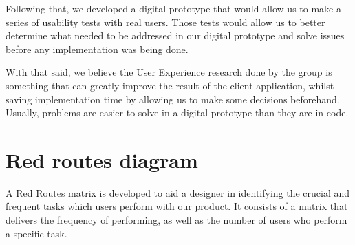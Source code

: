 \documentclass[a4paper,twoside,10pt]{report}
\begin{document}
Following that, we developed a digital prototype that would allow us to make a series of usability tests with real users. Those tests would allow us to better determine what needed to be addressed in our digital prototype and solve issues before any implementation was being done.

With that said, we believe the User Experience research done by the group is something that can greatly improve the result of the client application, whilst saving implementation time by allowing us to make some decisions beforehand. Usually, problems are easier to solve in a digital prototype than they are in code.

\section{Red routes diagram}
A Red Routes matrix is developed to aid a designer in identifying the crucial and frequent tasks which users perform with our product. It consists of a matrix that delivers the frequency of performing, as well as the number of users who perform a specific task.
 
\end{document}
